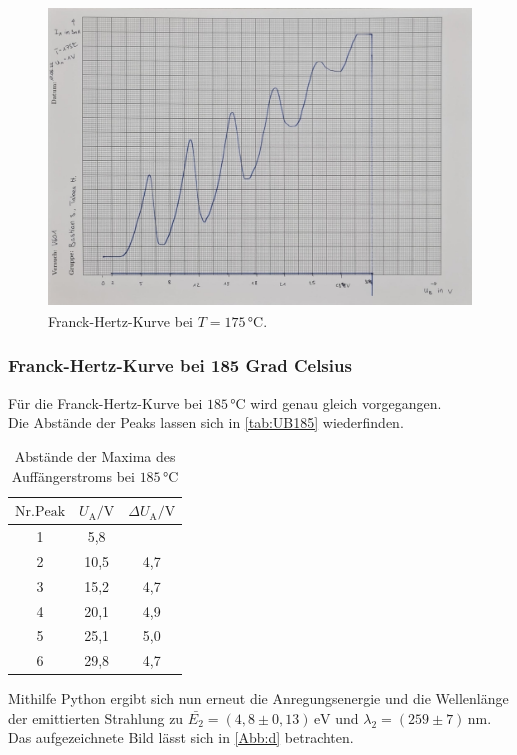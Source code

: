 \begin{figure}[H]
  \centering
  \includegraphics[height=8cm]{Messwerte/c.jpg}
  \caption{Franck-Hertz-Kurve bei $T=175\,\si{\celsius}$.}
  \label{Abb:c}
\end{figure}

\subsubsection{Franck-Hertz-Kurve bei 185 Grad Celsius}

Für die Franck-Hertz-Kurve bei $185 \, \si{\celsius}$ wird genau gleich vorgegangen.\\
Die Abstände der Peaks lassen sich in \autoref{tab:UB185} wiederfinden.

\begin{table}[!h]
  \begin{center}
    \begin{tabular}{|c|c|c|}
      \hline
      $\mathrm{Nr. Peak} $ & $U_{\mathrm{A}} / \si{\volt}$ & $\Delta U_{\mathrm{A}} / \si{\volt}$ \\
      \hline
      1 & 5,8 & \\
      2 & 10,5 & 4,7 \\
      3 & 15,2 & 4,7 \\
      4 & 20,1 & 4,9 \\
      5 & 25,1 & 5,0 \\
      6 & 29,8 & 4,7 \\
      \hline
    \end{tabular}
    \caption{Abstände der Maxima des Auffängerstroms bei $185 \, \si{\celsius}$}
    \label{tab:UB185}
  \end{center}
\end{table}

Mithilfe Python ergibt sich nun erneut die Anregungsenergie und die Wellenlänge der emittierten
Strahlung zu $\bar{E_2} = (4,8 \pm 0,13) \, \si{\electronvolt}$ und $\lambda_2 = (259 \pm 7) \, \si{\nano\meter}$.\\
Das aufgezeichnete Bild lässt sich in \autoref{Abb:d} betrachten.

